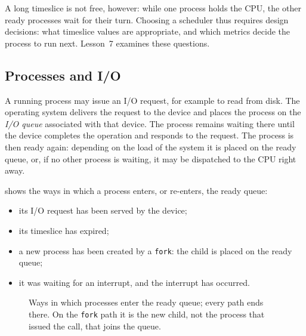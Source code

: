 \documentclass[../main.tex]{subfiles}
\begin{document}
A long timeslice is not free, however: while one process holds the CPU, the
other ready processes wait for their turn.  Choosing a scheduler thus
requires design decisions: what timeslice values are appropriate, and which
metrics decide the process to run next.  Lesson~7 examines these
questions.


\subsection{Processes and I/O}

A running process may issue an I/O request, for example to read from
disk.  The
operating system delivers the request to the device and places the process
on the \emph{I/O queue} associated with that device.  The process remains
waiting there until the device completes the operation and responds to the
request.  The process is then ready again: depending on the load of the
system it is placed on the ready queue, or, if no other process is waiting,
it may be dispatched to the CPU right away.

 shows the ways in which a process enters, or
re-enters, the ready queue:
\begin{itemize}
  \item its I/O request has been served by the device;
  \item its timeslice has expired;
  \item a new process has been created by a \texttt{fork}: the child is
    placed on the ready queue;
  \item it was waiting for an interrupt, and the interrupt has
    occurred.
\end{itemize}

\begin{figure}[htbp]
  \centering
  
  \caption{Ways in which processes enter the ready queue; every path ends
    there.  On the \texttt{fork} path it is the new child, not the process
    that issued the call, that joins the queue.}
  \label{fig:l02-queues}
\end{figure}
\end{document}
